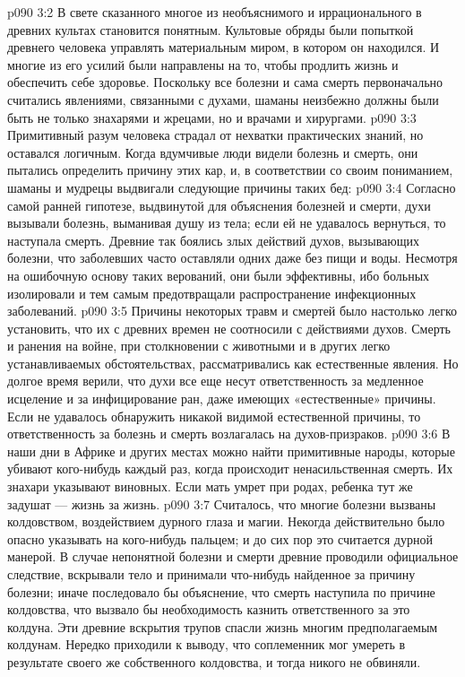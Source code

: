 \vs p090 3:2 В свете сказанного многое из необъяснимого и иррационального в древних культах становится понятным. Культовые обряды были попыткой древнего человека управлять материальным миром, в котором он находился. И многие из его усилий были направлены на то, чтобы продлить жизнь и обеспечить себе здоровье. Поскольку все болезни и сама смерть первоначально считались явлениями, связанными с духами, шаманы неизбежно должны были быть не только знахарями и жрецами, но и врачами и хирургами.
\vs p090 3:3 Примитивный разум человека страдал от нехватки практических знаний, но оставался логичным. Когда вдумчивые люди видели болезнь и смерть, они пытались определить причину этих кар, и, в соответствии со своим пониманием, шаманы и мудрецы выдвигали следующие причины таких бед:
\vs p090 3:4 \bibnobreakspace {} Согласно самой ранней гипотезе, выдвинутой для объяснения болезней и смерти, духи вызывали болезнь, выманивая душу из тела; если ей не удавалось вернуться, то наступала смерть. Древние так боялись злых действий духов, вызывающих болезни, что заболевших часто оставляли одних даже без пищи и воды. Несмотря на ошибочную основу таких верований, они были эффективны, ибо больных изолировали и тем самым предотвращали распространение инфекционных заболеваний.
\vs p090 3:5 \bibnobreakspace {} Причины некоторых травм и смертей было настолько легко установить, что их с древних времен не соотносили с действиями духов. Смерть и ранения на войне, при столкновении с животными и в других легко устанавливаемых обстоятельствах, рассматривались как естественные явления. Но долгое время верили, что духи все еще несут ответственность за медленное исцеление и за инфицирование ран, даже имеющих «естественные» причины. Если не удавалось обнаружить никакой видимой естественной причины, то ответственность за болезнь и смерть возлагалась на духов\hyp{}призраков.
\vs p090 3:6 В наши дни в Африке и других местах можно найти примитивные народы, которые убивают кого\hyp{}нибудь каждый раз, когда происходит ненасильственная смерть. Их знахари указывают виновных. Если мать умрет при родах, ребенка тут же задушат --- жизнь за жизнь.
\vs p090 3:7 \bibnobreakspace {} Считалось, что многие болезни вызваны колдовством, воздействием дурного глаза и магии. Некогда действительно было опасно указывать на кого\hyp{}нибудь пальцем; и до сих пор это считается дурной манерой. В случае непонятной болезни и смерти древние проводили официальное следствие, вскрывали тело и принимали что\hyp{}нибудь найденное за причину болезни; иначе последовало бы объяснение, что смерть наступила по причине колдовства, что вызвало бы необходимость казнить ответственного за это колдуна. Эти древние вскрытия трупов спасли жизнь многим предполагаемым колдунам. Нередко приходили к выводу, что соплеменник мог умереть в результате своего же собственного колдовства, и тогда никого не обвиняли.
